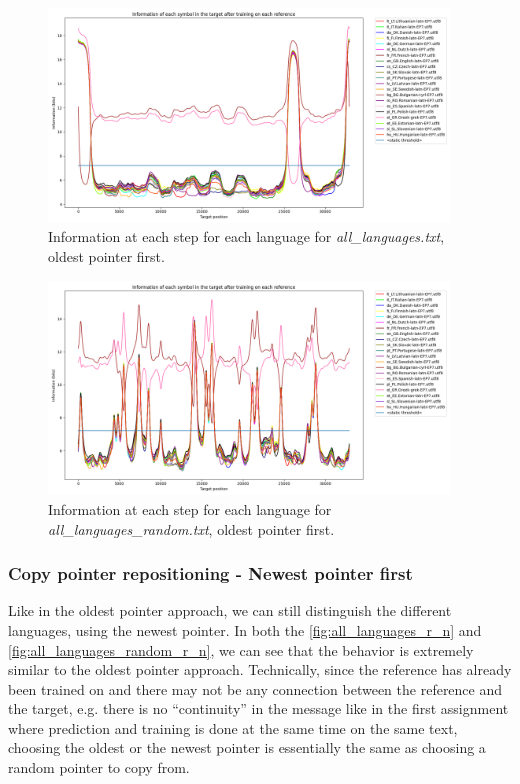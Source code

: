 \documentclass{article}
\begin{document}
\begin{figure}
    \centering
    \includegraphics[width=0.95\textwidth]{../results/all_languages/-r_o.png}
    \caption{Information at each step for each language for \textit{all\_languages.txt}, oldest pointer first.}
    \label{fig:all_languages_r_o}
\end{figure}

\begin{figure}
    \centering
    \includegraphics[width=0.95\textwidth]{../results/all_languages_random/-r_o.png}
    \caption{Information at each step for each language for \textit{all\_languages\_random.txt}, oldest pointer first.}
    \label{fig:all_languages_random_r_o}
\end{figure}

\subsubsection{Copy pointer repositioning - Newest pointer first}
\label{subsubsec:results_locate_lang_newest_pointer_first}

Like in the oldest pointer approach, we can still distinguish the different languages, using the newest pointer.
In both the \ref{fig:all_languages_r_n} and \ref{fig:all_languages_random_r_n}, we can see that the behavior is extremely similar to the oldest pointer approach.
Technically, since the reference has already been trained on and there may not be any connection between the reference and the target, e.g. there is no ``continuity'' in the message like in the first assignment where prediction and training is done at the same time on the same text, choosing the oldest or the newest pointer is essentially the same as choosing a random pointer to copy from.
\end{document}

